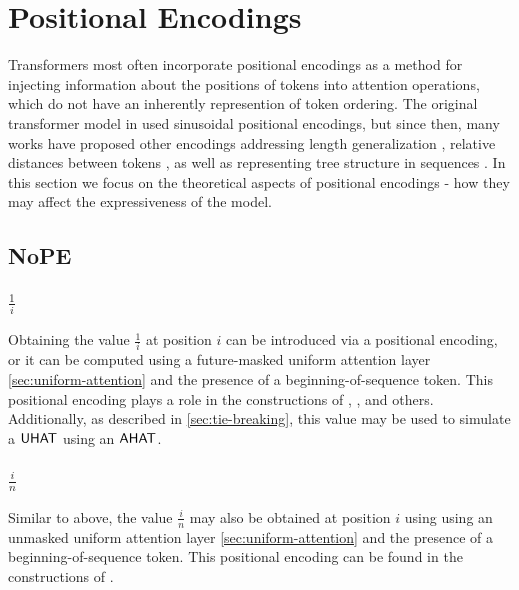 %
\chapter{Positional Encodings}
%

Transformers most often incorporate positional encodings as a method for injecting information about the positions of tokens into attention operations, which do not have an inherently represention of token ordering. The original transformer model in \citet{vaswani-etal-2017-attention} used sinusoidal positional encodings, but since then, many works have proposed other encodings addressing length generalization \citep{kazemnejad2024impact}, relative distances between tokens \citep{shaw2018self}, as well as representing tree structure in sequences \citep{shiv2019}. In this section we focus on the theoretical aspects of positional encodings - how they may affect the expressiveness of the model.


\section{NoPE}

\subsection{$\frac{1}{i}$}

Obtaining the value $\frac{1}{i}$ at position $i$ can be introduced via a positional encoding, or it can be computed using a future-masked uniform attention layer \cref{sec:uniform-attention} and the presence of a beginning-of-sequence token. This positional encoding plays a role in the constructions of \citet{barcelo-etal-2024-logical}, \citet{merrill-sabharwal-2024-cot}, and others. Additionally, as described in \cref{sec:tie-breaking}, this value may be used to simulate a $\textsf{UHAT}$ using an $\textsf{AHAT}$.



\subsection{$\frac{i}{n}$}
Similar to above, the value $\frac{i}{n}$ may also be obtained at position $i$ using using an unmasked uniform attention layer \cref{sec:uniform-attention} and the presence of a beginning-of-sequence token. This positional encoding can be found in the constructions of \cite{merrill2023parallelism,chiang-cholak-2022-parity,strobl2024transformers}.

